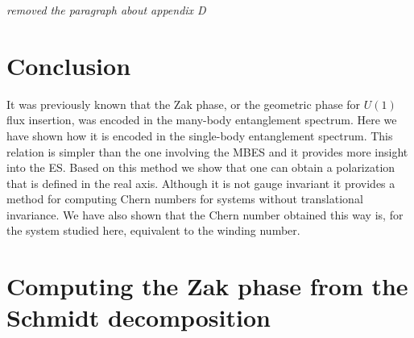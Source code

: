 \documentclass[twocolumn,amsmath,longbibliography,amssymb,superscriptaddress]{revtex4-1}
\newcommand{\carlos}[1]{{\color{red} #1}}
\newcommand{\mariac}[1]{{\it\color{cyan}#1}}
\begin{document}
\mariac{removed the paragraph about appendix D}



\section{Conclusion}

It was previously known that the Zak phase, or the geometric phase for $U(1)$ flux insertion, was encoded in the many-body entanglement spectrum. Here we have shown how it is encoded in the single-body entanglement spectrum. This relation is simpler than the one involving the MBES and it provides more insight into the ES. Based on this method we show that one can obtain a polarization that is defined in the real axis. Although it is not gauge invariant it provides a method for computing Chern numbers for systems without translational invariance. We have also shown that the Chern number obtained this way is, for the system studied here, equivalent to the winding number.

	

	
\appendix


\section{Computing the Zak phase from the Schmidt decomposition}\label{app:pollmann}
\end{document}
